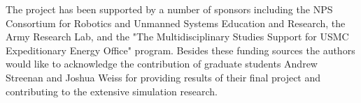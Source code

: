 \documentclass{ifacconf}
\begin{document}
\begin{ack}                               %
The project has been supported by a number of sponsors including the NPS Consortium for Robotics and Unmanned Systems Education and Research, the Army Research Lab, and the "The Multidisciplinary Studies Support for USMC Expeditionary Energy Office" program. Besides these funding sources the authors would like to acknowledge the contribution of graduate students Andrew Streenan and Joshua Weiss for providing results of their final project and contributing to the extensive simulation research.
\end{ack}



\end{document}

